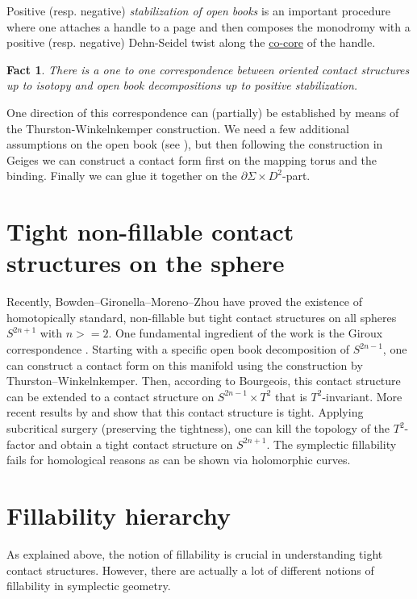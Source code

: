 \documentclass{amsart}
\newtheorem{fact}{Fact}
\begin{document}
Positive (resp. negative) \textit{stabilization of open books} is an important procedure where
one attaches a handle to a page and then composes the monodromy with 
a positive (resp. negative) Dehn-Seidel twist along the \underline{co-core} of the handle.

\begin{fact}\cite{Giroux02}
There is a one to one correspondence between oriented contact structures up to isotopy
and open book decompositions up to positive stabilization.
\end{fact}

One direction of this correspondence can (partially) be established by means of the 
Thurston-Winkelnkemper construction.
We need a few additional assumptions on the open book (see \cite[Theorem 7.3.3]{Geiges08}), but then following the construction in Geiges we can construct a contact form first
on the mapping torus and the binding. Finally we can glue it together on the $\partial \Sigma \times D^2$-part.

\section*{Tight non-fillable contact structures on the sphere}

Recently, Bowden--Gironella--Moreno--Zhou \cite{BGMZ22} have proved the existence of homotopically standard, non-fillable but tight contact structures on all spheres $S^{2n+1}$ with $n >= 2$. 
One fundamental ingredient of the work is the Giroux correspondence \cite{Giroux02}.
Starting with a specific open book decomposition of $S^{2n-1}$, one can construct a contact form on this manifold using the construction by Thurston--Winkelnkemper. 
Then, according to Bourgeois, this contact structure can be extended to a contact structure on $S^{2n-1}\times T^2$ that is $T^2$-invariant.
More recent results by \cite{BGM22} and \cite{AZ24} show that this contact structure is tight.
Applying subcritical surgery (preserving the tightness), one can kill the topology of the $T^2$-factor and obtain a tight contact structure on $S^{2n+1}$.
The symplectic fillability fails for homological reasons as can be shown via holomorphic curves.


\section*{Fillability hierarchy}
As explained above, the notion of fillability is crucial in understanding tight contact structures. However, there are actually a lot of different notions of fillability in symplectic geometry.
\end{document}
